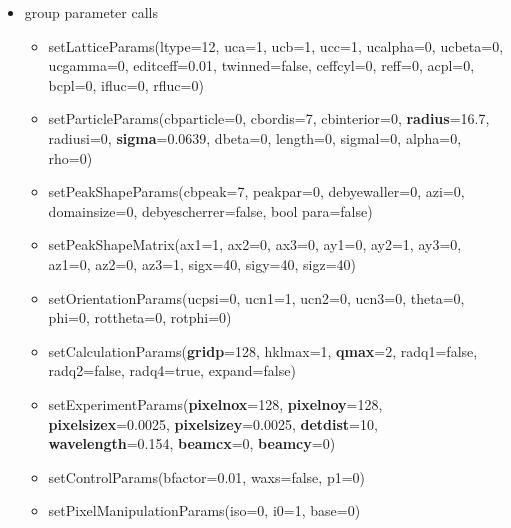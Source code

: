 \documentclass[11pt]{article} %
\begin{document}
\begin{itemize}
\item group parameter calls
\begin{itemize}\itemsep0pt
\item setLatticeParams(ltype=12, uca=1, ucb=1, ucc=1, ucalpha=0, ucbeta=0, ucgamma=0, editceff=0.01, twinned=false, ceffcyl=0, reff=0, acpl=0, bcpl=0, ifluc=0, rfluc=0)
\item setParticleParams(cbparticle=0, cbordis=7, cbinterior=0, {\bf radius}=16.7, radiusi=0, {\bf sigma}=0.0639, dbeta=0, length=0, sigmal=0, alpha=0, rho=0)
\item setPeakShapeParams(cbpeak=7, peakpar=0, debyewaller=0, azi=0, domainsize=0, debyescherrer=false, bool para=false)
\item setPeakShapeMatrix(ax1=1, ax2=0, ax3=0, ay1=0, ay2=1, ay3=0, az1=0, az2=0, az3=1, sigx=40, sigy=40, sigz=40)
\item setOrientationParams(ucpsi=0, ucn1=1, ucn2=0, ucn3=0, theta=0, phi=0, rottheta=0, rotphi=0)
\item setCalculationParams({\bf gridp}=128, hklmax=1, {\bf qmax}=2, radq1=false, radq2=false, radq4=true, expand=false)
\item setExperimentParams({\bf pixelnox}=128, {\bf pixelnoy}=128, {\bf pixelsizex}=0.0025, {\bf pixelsizey}=0.0025, {\bf detdist}=10, {\bf wavelength}=0.154, {\bf beamcx}=0, {\bf beamcy}=0)
\item setControlParams(bfactor=0.01, waxs=false, p1=0)
\item setPixelManipulationParams(iso=0, i0=1, base=0)
\end{itemize} %


\end{itemize}
\end{document}
